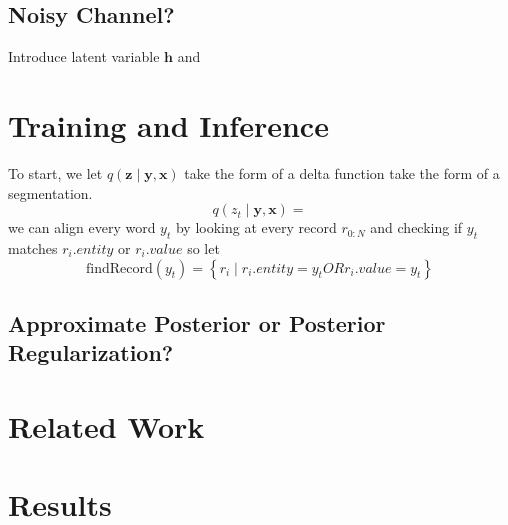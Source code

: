 \documentclass{article}
\newcommand\set[1]{\left\{#1\right\}}
\newcommand{\bh}{\mathbf{h}}
\newcommand{\bx}{\mathbf{x}}
\newcommand{\by}{\mathbf{y}}
\newcommand{\bz}{\mathbf{z}}
\begin{document}
\subsection{Noisy Channel?}
Introduce latent variable $\bh$ and 

\section{Training and Inference}
To start, we let $q(\bz\mid\by,\bx)$ take the form of a
delta function take the form of a segmentation.
$$q(z_t\mid\by,\bx)=$$
we can align every word $y_t$ by looking at every record $r_{0:N}$ and checking if $y_t$ matches $r_i.entity$ or $r_i.value$
so let
$$\textrm{findRecord}(y_t) = \set{ r_i \mid r_i.entity = y_t OR r_i.value = y_t }$$
\subsection{Approximate Posterior or Posterior Regularization?}

\section{Related Work}

\section{Results}




\end{document}
